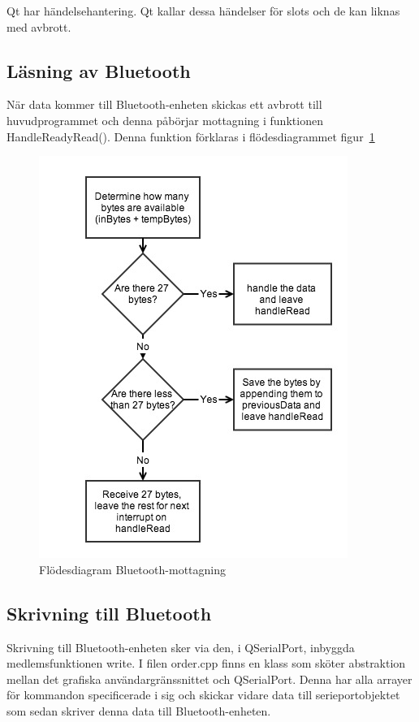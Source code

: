 \documentclass[a4paper,12pt,fleqn]{article}
\begin{document}
Qt har händelsehantering. Qt kallar dessa händelser för slots och de kan liknas med avbrott.

\subsection{Läsning av Bluetooth}
När data kommer till Bluetooth-enheten skickas ett avbrott till huvudprogrammet och denna påbörjar mottagning i funktionen HandleReadyRead(). Denna funktion förklaras i flödesdiagrammet figur~\ref{fig:BTpc}

\begin{figure}[htp] %
  \begin{center}
  \includegraphics[keepaspectratio=true,width=0.6\linewidth]{bilder/bluetoothpc.jpg}  %
  \end{center}
  \caption{Flödesdiagram Bluetooth-mottagning} %
  \label{fig:BTpc}
\end{figure}

\subsection{Skrivning till Bluetooth}
Skrivning till Bluetooth-enheten sker via den, i QSerialPort, inbyggda medlemsfunktionen write. I filen order.cpp finns en klass som sköter abstraktion mellan det grafiska användargränssnittet och QSerialPort. Denna har alla arrayer för kommandon specificerade i sig och skickar vidare data till serieportobjektet som sedan skriver denna data till Bluetooth-enheten. 
\end{document}
